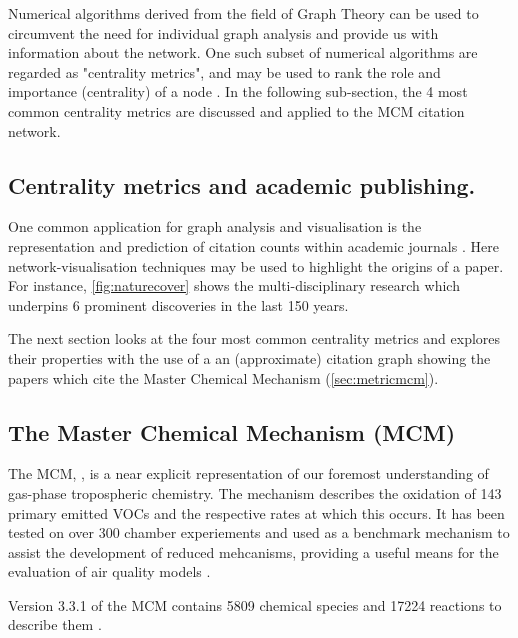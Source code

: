 Numerical algorithms derived from the field of Graph Theory can be used to circumvent the need for individual graph analysis and provide us with information about the network. One such subset of numerical algorithms are regarded as "centrality metrics", and may be used to rank the role and importance (centrality) of a node \citep{squaretower}. In the following sub-section, the 4 most common centrality metrics are discussed and applied to the MCM citation network. 


\subsection{Centrality metrics and academic publishing.}


One common application for graph analysis and visualisation is the representation and prediction of citation counts within academic journals \citep{cocite,google,naturecitation,netcoauthor}. Here network-visualisation techniques may be used to highlight the origins of a paper. For instance, \autoref{fig:naturecover} shows the multi-disciplinary research which underpins 6 prominent discoveries in the last 150 years. 

The next section looks at the four most common centrality metrics and explores their properties with the use of a an (approximate) citation graph showing the papers which cite the Master Chemical Mechanism (\autoref{sec:metricmcm}).



\subsection{The Master Chemical Mechanism (MCM)}\label{sec:metricmcm}

The MCM, \citep{mcm}, is a near explicit representation of our foremost understanding of gas-phase tropospheric chemistry. The mechanism describes the oxidation of 143 primary emitted VOCs and the respective rates at which this occurs. It has been tested on over 300 chamber experiements and used as a benchmark mechanism to assist the development of reduced mehcanisms, providing a useful means for the evaluation of air quality models \citep{defra1}.

Version 3.3.1 of the MCM contains 5809 chemical species and 17224 reactions to describe them \citep{isopmcm}.




